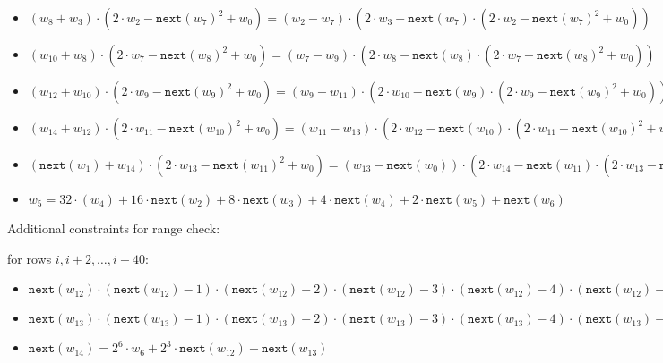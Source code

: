 \begin{itemize}
    \item $(w_{8} + w_{3}) \cdot (2 \cdot w_2 - \texttt{next}(w_7)^2 + w_{0}) = (w_2 - w_7) \cdot (2\cdot w_{3} - \texttt{next}(w_7) \cdot (2 \cdot w_2 - \texttt{next}(w_7)^2 + w_{0}))$
    \item $(w_{10} + w_{8}) \cdot (2 \cdot w_7 - \texttt{next}(w_8)^2 + w_{0}) = (w_7 - w_9) \cdot (2\cdot w_{8} - \texttt{next}(w_8) \cdot (2 \cdot w_7 - \texttt{next}(w_8)^2 + w_{0}))$
    \item $(w_{12} + w_{10}) \cdot (2 \cdot w_9 - \texttt{next}(w_9)^2 + w_{0}) = (w_9 - w_{11}) \cdot (2\cdot w_{10} - \texttt{next}(w_9) \cdot (2 \cdot w_9 - \texttt{next}(w_9)^2 + w_{0}))$
    \item $(w_{14} + w_{12}) \cdot  (2 \cdot w_{11} - \texttt{next}(w_{10})^2 + w_{0}) = (w_{11} - w_{13}) \cdot (2\cdot w_{12} - \texttt{next}(w_{10}) \cdot (2 \cdot w_{11} - \texttt{next}(w_{10})^2 + w_{0}))$
    \item $(\texttt{next}(w_{1}) + w_{14}) \cdot (2 \cdot w_{13} - \texttt{next}(w_{11})^2 + w_{0}) = (w_{13} - \texttt{next}(w_{0})) \cdot (2\cdot w_{14} - \texttt{next}(w_{11}) \cdot (2 \cdot w_{13} - \texttt{next}(w_{11})^2 + w_{0}))$ \\
    
    
    \item $w_5 = 32 \cdot (w_4) + 16 \cdot \texttt{next}(w_{2}) + 8 \cdot \texttt{next}(w_{3}) + 4 \cdot \texttt{next}(w_{4}) + 2 \cdot \texttt{next}(w_{5}) + \texttt{next}(w_{6})$
    \end{itemize}

Additional constraints for range check:

for rows $i, i+2, \dots, i+40$:
\begin{itemize}
    \item $\texttt{next}(w_{12}) \cdot (\texttt{next}(w_{12}) - 1) \cdot (\texttt{next}(w_{12}) - 2) \cdot (\texttt{next}(w_{12}) - 3) \cdot (\texttt{next}(w_{12}) - 4) \cdot (\texttt{next}(w_{12}) - 5) \cdot (\texttt{next}(w_{12}) - 6) \cdot (\texttt{next}(w_{12}) - 7)= 0$
    \item $\texttt{next}(w_{13}) \cdot (\texttt{next}(w_{13}) - 1) \cdot (\texttt{next}(w_{13}) - 2) \cdot (\texttt{next}(w_{13}) - 3) \cdot (\texttt{next}(w_{13}) - 4) \cdot (\texttt{next}(w_{13}) - 5) \cdot (\texttt{next}(w_{13}) - 6) \cdot (\texttt{next}(w_{13}) - 7)= 0$
    \item $\texttt{next}(w_{14}) = 2^6\cdot w_6 + 2^3 \cdot \texttt{next}(w_{12}) + \texttt{next}(w_{13})$
\end{itemize}


